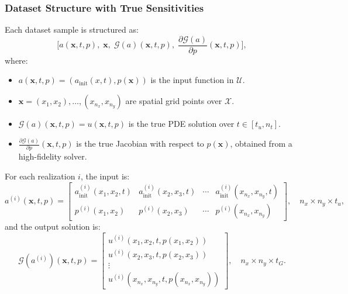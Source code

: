 \subsubsection*{Dataset Structure with True Sensitivities}

Each dataset sample is structured as:
\begin{equation}
\big[ a(\textbf{x}, t, p),\; \textbf{x},\; \mathcal{G}(a)(\textbf{x}, t, p),\; \frac{\partial \mathcal{G}(a)}{\partial p}(\textbf{x}, t, p) \big],
\end{equation}
where:
\begin{itemize}
    \item \( a(\textbf{x}, t, p) = (a_{\text{init}}(x, t), p(\textbf{x})) \) is the input function in \(\mathcal{U}\).
    \item \( \textbf{x} = (x_1, x_2), \dots, (x_{n_x}, x_{n_y}) \) are spatial grid points over \(\mathcal{X}\).
    \item \( \mathcal{G}(a)(\textbf{x}, t, p) = u(\textbf{x}, t, p) \) is the true PDE solution over \( t \in [t_u, n_t] \).
    \item \( \frac{\partial \mathcal{G}(a)}{\partial p}(\textbf{x}, t, p) \) is the true Jacobian with respect to \( p(\textbf{x}) \), obtained from a high-fidelity solver.
\end{itemize}

For each realization \( i \), the input is:
\begin{equation}
a^{(i)}(\textbf{x}, t, p) =
\begin{bmatrix}
a_{\text{init}}^{(i)}(x_1, x_2, t) & a_{\text{init}}^{(i)}(x_2, x_3, t) & \cdots & a_{\text{init}}^{(i)}(x_{n_x}, x_{n_y}, t) \\
p^{(i)}(x_1, x_2) & p^{(i)}(x_2, x_3) & \cdots & p^{(i)}(x_{n_x}, x_{n_y})
\end{bmatrix}, \quad n_x \times n_y \times t_u,
\end{equation}
and the output solution is:
\begin{equation}
\mathcal{G}(a^{(i)})(\textbf{x}, t, p) =
\begin{bmatrix}
u^{(i)}(x_1, x_2, t, p(x_1, x_2)) \\
u^{(i)}(x_2, x_3, t, p(x_2, x_3)) \\
\vdots \\
u^{(i)}(x_{n_x}, x_{n_y}, t, p(x_{n_x}, x_{n_y}))
\end{bmatrix}, \quad n_x \times n_y \times t_G.
\end{equation}

